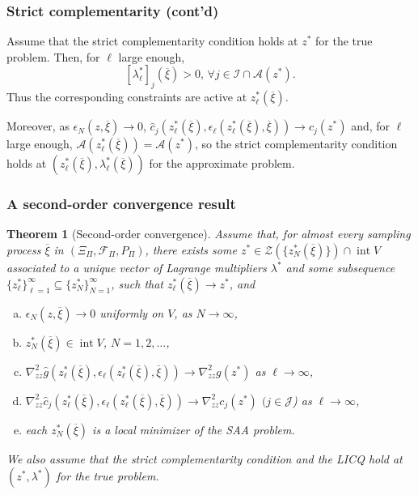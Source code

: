 \documentclass[aspectratio=169]{beamer}
\newtheorem{theo}{Theorem}
\begin{document}
\begin{frame}
\frametitle{Strict complementarity (cont'd)}

Assume that the strict complementarity condition holds at $z^*$ for the true problem.
Then, for $\ell$ large enough,
$$
[\lambda^*_{\ell}]_j(\overline{\xi}) > 0,\, \forall j \in \mathcal{I} \cap \mathcal{A} ( z^* ) .
$$
Thus the corresponding constraints are active at $z^*_{\ell}(\overline{\xi})$.

\mbox{}

Moreover, as $\epsilon_N (z, \overline{\xi} ) \rightarrow 0$,
$\hat{c}_j \left( z^*_{\ell}(\overline{\xi}),
\epsilon_{\ell}(z^*_{\ell}(\overline{\xi}),\overline{\xi}) \right) \rightarrow
c_j ( z^* )$ and, for $\ell$ large enough,
$\mathcal{A} \left( z^*_{\ell}(\overline{\xi}) \right) = \mathcal{A} (
z^* )$, so the strict complementarity condition holds at $\left(
  z^*_{\ell}(\overline{\xi}), \lambda_{\ell}^*(\overline{\xi})
\right)$ for the approximate problem.



\end{frame}

\begin{frame}
\frametitle{A second-order convergence result}
\small

\begin{theo}[Second-order convergence]
\label{th:soc}
Assume that, for almost every sampling process $\overline{\xi}$ in $(\Xi_{\Pi}, \mathcal{F}_{\Pi}, P_{\Pi})$, there exists some $z^* \in \mathcal{Z} \left(\lbrace
  z^*_N(\overline{\xi})\rbrace\right) \cap \operatorname{int} V$ associated to a unique vector of Lagrange multipliers $\lambda^*$ and some subsequence $\lbrace z_{\ell}^* \rbrace_{\ell = 1}^{\infty} \subseteq \lbrace  z_N^* \rbrace_{N = 1}^{\infty}$, such that $z^*_{\ell}(\overline{\xi}) \rightarrow z^*$, and
\begin{enumerate}[(a)]
\item
$\epsilon_N \left( z,\overline{\xi} \right)
  \rightarrow 0$ uniformly on $V$, as $N \rightarrow \infty$,
\item
$z^*_N(\overline{\xi}) \in \operatorname{int} V$, $N = 1,2,\ldots$,
\item
$\nabla^2_{zz} \hat{g} \left( z^*_{\ell}(\overline{\xi}), 
\epsilon_{\ell}(z^*_{\ell}(\overline{\xi}),\overline{\xi}) \right)
\rightarrow \nabla^2_{zz} g ( z^* )$ as $\ell \rightarrow \infty$,
\item
$\nabla^2_{zz} \hat{c}_j \left( z^*_{\ell}(\overline{\xi}), 
\epsilon_{\ell}(z^*_{\ell}(\overline{\xi}),\overline{\xi}) \right)
\rightarrow \nabla^2_{zz} c_j ( z^* )$ $(j \in \mathcal{J}$) as
$\ell \rightarrow \infty$,
\item
each $z^*_N(\overline{\xi})$ is a local minimizer of the SAA problem.
\end{enumerate}
We also assume that the strict complementarity condition and the LICQ hold at $( z^*, \lambda^* )$ for the true problem.
\end{theo}

\end{frame}
\end{document}
